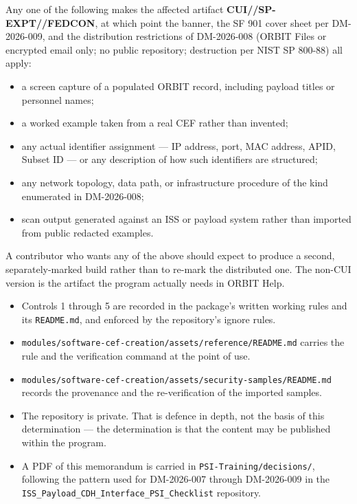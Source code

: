 {\begin{enumerate}

Any one of the following makes the affected artifact \textbf{CUI//SP-EXPT//FEDCON}, at which point the banner, the SF 901 cover sheet per DM-2026-009, and the distribution restrictions of DM-2026-008 (ORBIT Files or encrypted email only; no public repository; destruction per NIST SP 800-88) all apply:

\begin{itemize}
    \item a screen capture of a populated ORBIT record, including payload titles or personnel names;
    \item a worked example taken from a real CEF rather than invented;
    \item any actual identifier assignment --- IP address, port, MAC address, APID, Subset ID --- or any description of how such identifiers are structured;
    \item any network topology, data path, or infrastructure procedure of the kind enumerated in DM-2026-008;
    \item scan output generated against an ISS or payload system rather than imported from public redacted examples.
\end{itemize}

A contributor who wants any of the above should expect to produce a second, separately-marked build rather than to re-mark the distributed one. The non-CUI version is the artifact the program actually needs in ORBIT Help.


\begin{itemize}
    \item Controls 1 through 5 are recorded in the package's written working rules and its \texttt{README.md}, and enforced by the repository's ignore rules.
    \item \texttt{modules/software-cef-creation/assets/reference/README.md} carries the rule and the verification command at the point of use.
    \item \texttt{modules/software-cef-creation/assets/security-samples/README.md} records the provenance and the re-verification of the imported samples.
    \item The repository is private. That is defence in depth, not the basis of this determination --- the determination is that the content may be published within the program.
    \item A PDF of this memorandum is carried in \texttt{PSI-Training/decisions/}, following the pattern used for DM-2026-007 through DM-2026-009 in the \texttt{ISS\_Payload\_CDH\_Interface\_PSI\_Checklist} repository.
\end{itemize}


\end{enumerate}}
